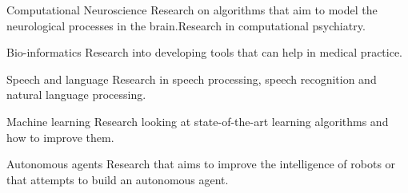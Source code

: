 

\begin{cvskills}


\cvskill
    {Computational Neuroscience} %
    {Research on algorithms that aim to model the neurological processes in the brain.\newline Research in computational psychiatry.} %
    
  \cvskill
    {Bio-informatics} %
    {Research into developing tools that can help in medical practice.} %

  \cvskill    
    {Speech and language} %
    {Research in speech processing, speech recognition and natural language processing.} %

  \cvskill
    {Machine learning} %
    {Research looking at state-of-the-art learning algorithms and how to improve them.} %

  \cvskill
    {Autonomous agents} %
    {Research that aims to improve the intelligence of robots or that attempts to build an autonomous agent.}  %



\end{cvskills}
